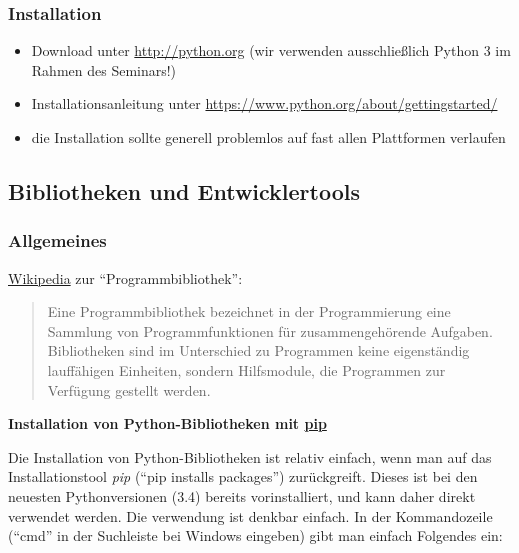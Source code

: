 \subsubsection{\texorpdfstring{{Installation}}{Installation}}

\begin{itemize}
\itemsep1pt\parskip0pt
\item
  {Download unter \url{http://python.org} (wir verwenden ausschließlich
  Python 3 im Rahmen des Seminars!)}
\item
  {Installationsanleitung unter
  \url{https://www.python.org/about/gettingstarted/}}
\item
  {die Installation sollte generell problemlos auf fast allen
  Plattformen verlaufen}
\end{itemize}

\subsection{\texorpdfstring{{Bibliotheken und
Entwicklertools}}{Bibliotheken und Entwicklertools}}

\subsubsection{\texorpdfstring{{Allgemeines}}{Allgemeines}}

\href{http://de.wikipedia.org/wiki/Programmbibliothek}{Wikipedia} zur
``Programmbibliothek'':

\begin{quote}
Eine Programmbibliothek bezeichnet in der Programmierung eine Sammlung
von Programmfunktionen für zusammengehörende Aufgaben. Bibliotheken sind
im Unterschied zu Programmen keine eigenständig lauffähigen Einheiten,
sondern Hilfsmodule, die Programmen zur Verfügung gestellt werden.
\end{quote}

\vspace{0.5cm}\par\noindent\textbf{Installation von Python-Bibliotheken mit\vspace{0.5cm}
\href{http://pypa.io}{pip}}

Die Installation von Python-Bibliotheken ist relativ einfach, wenn man
auf das Installationstool \emph{pip} (``pip installs packages'')
zurückgreift. Dieses ist bei den neuesten Pythonversionen (3.4) bereits
vorinstalliert, und kann daher direkt verwendet werden. Die verwendung
ist denkbar einfach. In der Kommandozeile (``cmd'' in der Suchleiste bei
Windows eingeben) gibt man einfach Folgendes ein:

